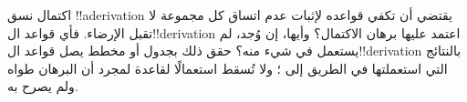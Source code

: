 \documentclass[../../../include/open-logic-section]{subfiles}
\begin{document}
\begin{prob}
اكتمال نسق !!a{derivation} يقتضي أن تكفي قواعده لإثبات عدم اتساق
كل مجموعة لا تقبل الإرضاء. فأي قواعد ال!!{derivation} اعتمد عليها
برهان الاكتمال؟ وأيها، إن وُجد، لم يستعمل في شيء منه؟ حقق ذلك بجدول
أو مخطط يصل قواعد ال!!{derivation} بالنتائج التي استعملتها في الطريق
إلى ؛ ولا تُسقط استعمالًا
لقاعدة لمجرد أن البرهان طواه ولم يصرح به.
\end{prob}
\tagendprob
\end{document}
